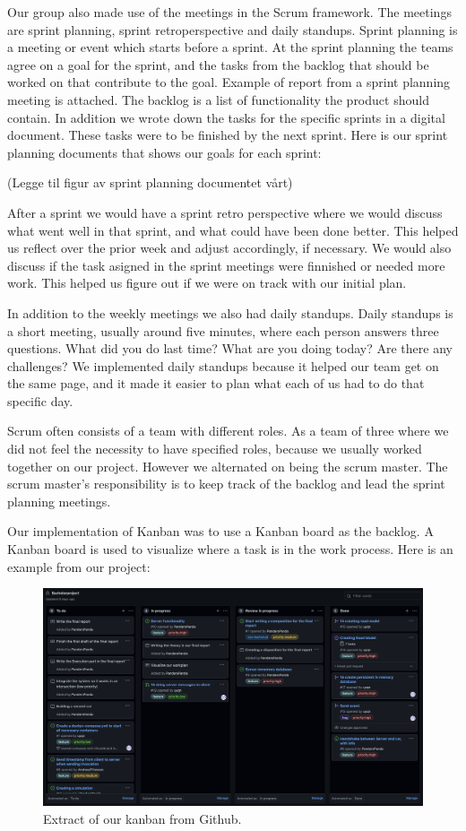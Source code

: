 Our group also made use of the meetings in the Scrum framework. The meetings are sprint planning, sprint retroperspective and daily standups. Sprint planning is a meeting or event which starts before a sprint. At the sprint planning the teams agree on a goal for the sprint, and the tasks from the backlog that should be worked on that contribute to the goal. Example of report from a sprint planning meeting is attached. The backlog is a list of functionality the product should contain. In addition we wrote down the tasks for the specific sprints in a digital document. These tasks were to be finished by the next sprint. Here is our sprint planning documents that shows our goals for each sprint:

(Legge til figur av sprint planning documentet vårt)

After a sprint we would have a sprint retro perspective where we would discuss what went well in that sprint, and what could have been done better. This helped us reflect over the prior week and adjust accordingly, if necessary. We would also discuss if the task asigned in the sprint meetings were finnished or needed more work. This helped us figure out if we were on track with our initial plan. 
 
In addition to the weekly meetings we also had daily standups. Daily standups is a short meeting, usually around five minutes, where each person answers three questions. What did you do last time? What are you doing today? Are there any challenges? We implemented daily standups because it helped our team get on the same page, and it made it easier to plan what each of us had to do that specific day.

Scrum often consists of a team with different roles. As a team of three where we did not feel the necessity to have specified roles, because we usually worked together on our project. However we alternated on being the scrum master. The scrum master’s responsibility is to keep track of the backlog and lead the sprint planning meetings.

Our implementation of Kanban was to use a Kanban board as the backlog. A Kanban board is used to visualize where a task is in the work process. Here is an example from our project:

\begin{figure}[h!]
	\centering
	\includegraphics[width=1\linewidth]{figures/kanban_screenshot}
	\caption[kanban screenshot]{Extract of our kanban from Github.}
	\label{fig:kanbanscreenshot}
\end{figure}

